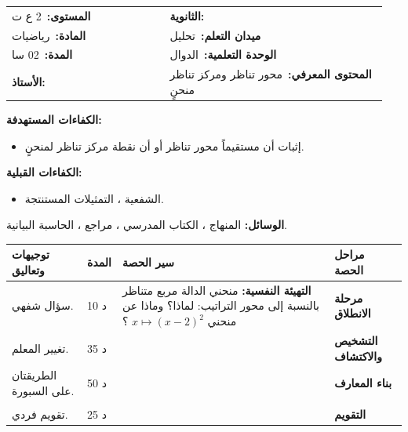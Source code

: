 \documentclass[12pt,a4paper]{article}
\makeatletter
\newenvironment{LTR}{\begin{otherlanguage}{english}}{\end{otherlanguage}}
\newcommand{\ar}[1]{\foreignlanguage{arabic}{#1}}
\newcommand{\Phase}[1]{\textbf{#1}}
\newcommand{\Fld}[2]{\textbf{#1:}\ #2}
\newcommand{\ModhHead}[9]{%
\begin{LTR}
\begin{tcolorbox}[enhanced,colback=white,colframe=cThm!85!black,arc=4mm,boxrule=1pt,top=14pt,bottom=6pt,left=8pt,right=8pt,
 overlay={\node[fill=cThm!85!black,text=white,rounded corners=3mm,inner xsep=14pt,inner ysep=4pt,font=\large\bfseries] at ([yshift=0pt]frame.north){\ar{مذكرة رقم #1}};},
 before upper={\selectlanguage{arabic}}]
\begin{tabular}{@{}p{0.4\linewidth}p{0.55\linewidth}@{}}
\Fld{المستوى}{#2} & \Fld{الثانوية}{\dotfill}\\[3pt]
\Fld{المادة}{رياضيات} & \Fld{ميدان التعلم}{#3}\\[3pt]
\Fld{المدة}{#5} & \Fld{الوحدة التعلمية}{#4}\\[3pt]
\Fld{الأستاذ}{\dotfill} & \Fld{المحتوى المعرفي}{#6}\\
\end{tabular}
\end{tcolorbox}
\begin{tcolorbox}[enhanced,colback=white,colframe=cThm!85!black,arc=3mm,boxrule=0.8pt,sidebyside,sidebyside align=top,lefthand ratio=0.5,
 segmentation style={dashed,cThm!60},before upper={\selectlanguage{arabic}},before lower={\selectlanguage{arabic}}]
\textbf{الكفاءات المستهدفة:}\par #8
\tcblower
\textbf{الكفاءات القبلية:}\par #7
\end{tcolorbox}
\end{LTR}
\par\smallskip\textbf{الوسائل:} #9\par\smallskip}
\newenvironment{Sayr}{%
\begin{LTR}\renewcommand{\arraystretch}{1.25}
\begin{longtable}{|p{0.17\textwidth}|>{\centering\arraybackslash}p{0.06\textwidth}|p{0.53\textwidth}|>{\centering\arraybackslash}p{0.12\textwidth}|}
\hline\rowcolor{cThm!12}\ar{\textbf{توجيهات وتعاليق}} & \ar{\textbf{المدة}} & \ar{\textbf{سير الحصة}} & \ar{\textbf{مراحل الحصة}}\\\hline\endhead
\hline\endfoot}{\end{longtable}\end{LTR}}
\newcommand{\Row}[4]{\ar{\small #4} & \ar{#3} & \ar{#2} & \cellcolor{cThm!8}\ar{\Phase{#1}}\\\hline}
\newcommand{\Lab}[2]{\foreignlanguage{english}{\tcbox[on line,colback=#1,colframe=#1,boxrule=0pt,arc=2pt,boxsep=1pt,left=5pt,right=5pt,top=1pt,bottom=1pt]{\ar{\textcolor{white}{\textbf{#2}}}}}}
\newcommand{\Num}[1]{\foreignlanguage{english}{\tikz[baseline=(c.base)]\node[fill=cDef,text=white,inner sep=2pt,font=\footnotesize\bfseries](c){#1};}}
\newcommand{\ck}{\ensuremath{{\color{cRem}\checkmark}}}
\makeatother
\begin{document}
\newpage
\ModhHead{06}{2 ع ت}{تحليل}{الدوال}{02 سا}{محور تناظر ومركز تناظر منحنٍ}%
{\begin{itemize}\item الشفعية ، التمثيلات المستنتجة.\end{itemize}}%
{\begin{itemize}\item إثبات أن مستقيماً محور تناظر أو أن نقطة مركز تناظر لمنحنٍ.\end{itemize}}%
{المنهاج ، الكتاب المدرسي ، مراجع ، الحاسبة البيانية.}
\begin{Sayr}
\Row{مرحلة الانطلاق}{%
\textbf{التهيئة النفسية:} منحني الدالة مربع متناظر بالنسبة إلى محور التراتيب: لماذا؟ وماذا عن منحني $x\mapsto(x-2)^2$ ؟}{10 د}{سؤال شفهي.}
\Row{التشخيص والاكتشاف}{%
\Lab{cEx}{وضعية مقترحة}\ $f(x)=x^2-4x+1$. نضع $X=x-2$ و $Y=y+3$ (تغيير المبدأ إلى $\Omega(2;-3)$).\par\ck\ نجد $Y=X^2$: دالة زوجية في المعلم الجديد ، إذن المستقيم $x=2$ محور تناظر لـ $C_f$.\par
}{35 د}{تغيير المعلم.}
\Row{بناء المعارف}{%
\Lab{cThm}{خاصية}\par\ck\ المستقيم $x=a$ محور تناظر لـ $C_f$ إذا كان: من أجل كل $x$ من $D_f$ ، $(2a-x)\in D_f$ و $f(2a-x)=f(x)$.\par
\ck\ النقطة $\Omega(a;b)$ مركز تناظر لـ $C_f$ إذا كان: من أجل كل $x$ من $D_f$ ، $(2a-x)\in D_f$ و $f(2a-x)+f(x)=2b$.\par
\Lab{cEx}{مثال}\par\ck\ $f(x)=x^2-4x+1$: $f(4-x)=(4-x)^2-4(4-x)+1=x^2-4x+1=f(x)$ ، إذن $x=2$ محور تناظر.\par
\ck\ $g(x)=\dfrac{2x+3}{x+1}=2+\dfrac1{x+1}$: $g(-2-x)+g(x)=2-\dfrac1{x+1}+2+\dfrac1{x+1}=4$ ، إذن $\Omega(-1;2)$ مركز تناظر.\par
}{50 د}{الطريقتان على السبورة.}
\Row{}{%
\Lab{cThm!80!black}{حذار}\ نتحقق أولاً من أن $D_f$ متناظرة بالنسبة إلى $a$.\par\Lab{cRem}{ملاحظات}\ يمكن أيضاً استعمال تغيير المعلم $X=x-a$ ، $Y=y-b$ ثم دراسة شفعية الدالة الجديدة.}{}{}
\Row{التقويم}{%
\Lab{cEx}{تطبيق}\par \Num{1} بيّن أن $x=1$ محور تناظر لمنحني $f(x)=x^2-2x+3$. \Num{2} بيّن أن $\Omega(1;-1)$ مركز تناظر لمنحني $h(x)=x^3-3x^2+1$.\par\textbf{الحل:} \Num{1} $f(2-x)=x^2-2x+3=f(x)$ ؛ \Num{2} $h(2-x)+h(x)=-2=2\times(-1)$.\par\textbf{واجب منزلي:} تمارين من الكتاب المدرسي.\par\smallskip\textbf{ملاحظات حول سير الحصة:} \dotfill}{25 د}{تقويم فردي.}
\end{Sayr}
\end{document}
